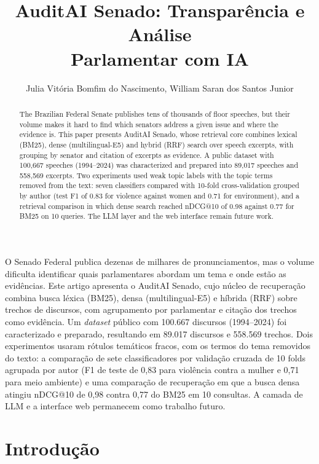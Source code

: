 \documentclass[12pt]{article}
\title{AuditAI Senado: Transparência e Análise\\ Parlamentar com IA}
\author{Julia Vitória Bomfim do Nascimento\inst{1}, William Saran dos Santos Junior\inst{1}}
\begin{document}
\maketitle

\begin{abstract}
  The Brazilian Federal Senate publishes tens of thousands of floor speeches, but their volume
  makes it hard to find which senators address a given issue and where the evidence is. This
  paper presents AuditAI Senado, whose retrieval core combines lexical (BM25), dense
  (multilingual-E5) and hybrid (RRF) search over speech excerpts, with grouping by senator and
  citation of excerpts as evidence. A public dataset with 100,667 speeches (1994--2024) was
  characterized and prepared into 89,017 speeches and 558,569 excerpts. Two experiments used
  weak topic labels with the topic terms removed from the text: seven classifiers compared with
  10-fold cross-validation grouped by author (test F1 of 0.83 for violence against women and 0.71
  for environment), and a retrieval comparison in which dense search reached nDCG@10 of 0.98 against
  0.77 for BM25 on 10 queries. The LLM layer and the web interface remain future work.
\end{abstract}

\begin{resumo}
  O Senado Federal publica dezenas de milhares de pronunciamentos, mas o volume dificulta
  identificar quais parlamentares abordam um tema e onde estão as evidências. Este artigo
  apresenta o AuditAI Senado, cujo núcleo de recuperação combina busca léxica (BM25), densa
  (multilingual-E5) e híbrida (RRF) sobre trechos de discursos, com agrupamento por parlamentar e
  citação dos trechos como evidência. Um \textit{dataset} público com 100.667 discursos
  (1994--2024) foi caracterizado e preparado, resultando em 89.017 discursos e 558.569 trechos.
  Dois experimentos usaram rótulos temáticos fracos, com os termos do tema removidos do texto:
  a comparação de sete classificadores por validação cruzada de 10 folds agrupada por autor (F1 de
  teste de 0,83 para violência contra a mulher e 0,71 para meio ambiente) e uma comparação de
  recuperação em que a busca densa atingiu nDCG@10 de 0,98 contra 0,77 do BM25 em 10 consultas.
  A camada de LLM e a interface web permanecem como trabalho futuro.
\end{resumo}

\section{Introdução}
\end{document}
